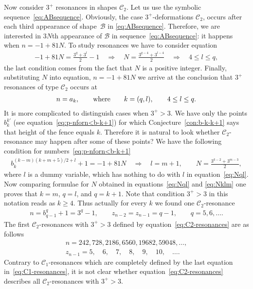 \documentclass[pdftex]{sigma}
\numberwithin{equation}{section}
\begin{document}
Now consider $3^+$ resonances in shapes $\mathcal{C}_2$. Let us use the symbolic sequence~\eqref{eq:ABsequence}. Obviously,
the case $3^+$-deformations $\mathcal{C}_2$, occurs after each third appearance of shape~$\mathcal{B}$ in \eqref{eq:ABsequence}.
Therefore, we are interested in $3N$th appearance of $\mathcal{B}$ in sequence~\eqref{eq:ABsequence}: it happens when $n=-1+81N$.
To study resonances we have to consider equation
\begin{gather}\label{eq:Nql}
-1+81N=\frac{3^q+3^l}{2}-1 \quad \Longrightarrow\quad
N=\frac{3^{q-4}+3^{l-4}}{2}\quad \Longrightarrow\quad
4\leq l\leq q,
\end{gather}
the last condition comes from the fact that $N$ is a positive integer. Finally, substituting $N$ into equation, $n=-1+81N$ we
arrive at the conclusion that $3^+$ resonances of type $\mathcal{C}_2$ occurs at
\begin{gather*}
n=a_k,\qquad{\rm where}\qquad
k=(q,l),\qquad
4\leq l\leq q.
\end{gather*}
It is more complicated to distinguish cases when $3^+>3$. We have only the points $b_k^{k'}$ (see equation~\eqref{eq:p-nforn<b-k+1})
for which Conjecture~\ref{con:b-k-k+1} says that height of the fence equals $k$. Therefore it is natural to look
whether $\mathcal{C}_2$-resonance may happen after some of these points?
We have the following condition for numbers~\eqref{eq:p-nforn<b-k+1}
\begin{gather}\label{eq:Nklm}
b_k^{(k-m)(k+m+5)/2+l}+1=-1+81N \quad \Longrightarrow\quad l=m+1, \qquad
N=\frac{3^{k-2}+3^{m-3}}2,
\end{gather}
where $l$ is a dummy variable, which has nothing to do with $l$ in equation~\eqref{eq:Nql}. Now comparing formulae for $N$
obtained in equations~\eqref{eq:Nql} and \eqref{eq:Nklm} one proves that $k=m$, $q=l$, and $q=k+1$. Note that condition
$3^+>3$ in this notation reads as $k\geq4$. Thus actually for every $k$ we found one $\mathcal{C}_2$-resonance
\begin{gather}\label{eq:C2-resonances}
n=b_{q-1}^q+1=3^q-1, \qquad z_{n-2}=z_{n-1}=q-1,\qquad q=5,6,\ldots.
\end{gather}
The first $\mathcal{C}_2$-resonances with $3^+>3$ defined by equation~\eqref{eq:C2-resonances} are as follows
\begin{gather*}
n =242, 728, 2186, 6560, 19682, 59048,\ldots,\\ %
z_{n-1} = 5,\quad 6,\quad 7,\quad 8,\quad 9,\quad 10,\quad \ldots.\nonumber
\end{gather*}
Contrary to $\mathcal{C}_1$-resonances which are completely defined by the last equation in~\eqref{eq:C1-resonances}, it is not
clear whether equation~\eqref{eq:C2-resonances} describes all $\mathcal{C}_2$-resonances with $3^+>3$.
\end{document}
